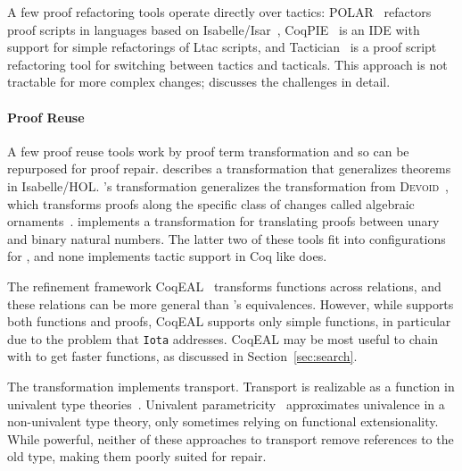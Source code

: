 A few proof refactoring tools operate directly over tactics:
POLAR~\cite{Dietrich2013} refactors proof scripts in languages based on Isabelle/Isar~\cite{Wenzel2007isar},
CoqPIE~\cite{Roe2016} is an IDE with support for simple refactorings of Ltac scripts, and
Tactician~\cite{adams2015} is a proof script refactoring tool for switching between tactics and tacticals.
This approach is not tractable for more complex changes;
\citet{robert2018} discusses the challenges in detail.

\paragraph{Proof Reuse}

A few proof reuse tools work by proof term transformation and so can be repurposed for proof repair.
\citet{Johnsen2004} describes a transformation that generalizes theorems in Isabelle/HOL.
\toolname's transformation generalizes the transformation from \textsc{Devoid}~\cite{Ringer2019},
which transforms proofs along the specific class of changes called algebraic ornaments~\cite{mcbride}.
\citet{magaud2000changing} implements a transformation for translating proofs between
unary and binary natural numbers. 
The latter two of these tools fit into configurations for \toolname,
and none implements tactic support in Coq like \toolname does.

The refinement framework CoqEAL~\cite{cohen:hal-01113453} transforms functions across relations,
and these relations can be more general than \toolname's equivalences.
However, while \toolname supports both functions and proofs, CoqEAL supports only simple functions,
in particular due to the problem that \lstinline{Iota} addresses.
CoqEAL may be most useful to chain with \toolname to get faster functions,
as discussed in Section~\ref{sec:search}.

The \toolname transformation implements transport.
Transport is realizable as a function in univalent type theories~\cite{univalent2013homotopy}.
Univalent parametricity~\cite{tabareau2017equivalences} approximates univalence
in a non-univalent type theory, only sometimes relying on functional extensionality.
While powerful, neither of these approaches to transport remove references to the old type, making them poorly suited for repair.

